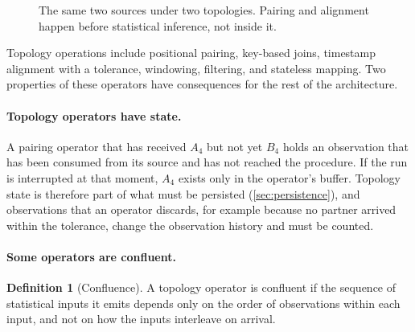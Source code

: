 \documentclass[11pt,a4paper]{article}
\theoremstyle{definition}
\newtheorem{definition}{Definition}
\theoremstyle{remark}
\begin{document}
\begin{figure}[t]
\centering
{}
\caption{
The same two sources under two topologies. Pairing and alignment happen
before statistical inference, not inside it.
}
\label{fig:topology}
\end{figure}

Topology operations include positional pairing, key-based joins,
timestamp alignment with a tolerance, windowing, filtering, and
stateless mapping. Two properties of these operators have consequences
for the rest of the architecture.

\paragraph{Topology operators have state.}
A pairing operator that has received $A_4$ but not yet $B_4$ holds an
observation that has been consumed from its source and has not reached
the procedure. If the run is interrupted at that moment, $A_4$ exists
only in the operator's buffer. Topology state is therefore part of what
must be persisted (\cref{sec:persistence}), and observations that an
operator discards, for example because no partner arrived within the
tolerance, change the observation history and must be counted.

\paragraph{Some operators are confluent.}
\begin{definition}[Confluence]
A topology operator is confluent if the sequence of statistical inputs
it emits depends only on the order of observations within each input,
and not on how the inputs interleave on arrival.
\end{definition}
\end{document}
